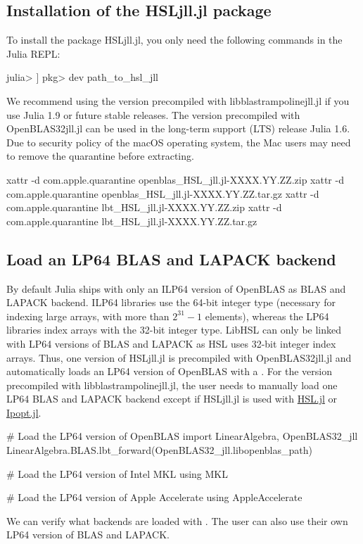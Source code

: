 \documentclass[gdweb]{geradwp}
\renewcommand{\_}{\raisebox{+0.35mm}{\textunderscore}}
\newcommand{\LibHSL}{LibHSL\xspace}
\newcommand{\HSLjll}{HSL\_jll.jl\xspace}
\newcommand{\LBTjll}{libblastrampoline\_jll.jl\xspace}
\newcommand{\OpenBLASjll}{OpenBLAS32\_jll.jl\xspace}
\begin{document}
\subsection{Installation of the \HSLjll package}

To install the package \HSLjll, you only need the following commands in the Julia REPL:
\begin{jllisting}
julia> ]
pkg> dev path_to_hsl_jll
\end{jllisting}
We recommend using the version precompiled with \LBTjll if you use Julia 1.9 or future stable releases.
The version precompiled with \OpenBLASjll can be used in the long-term support (LTS) release Julia 1.6.
Due to security policy of the macOS operating system, the Mac users may need to remove the quarantine before extracting.
\begin{jllisting}
xattr -d com.apple.quarantine openblas_HSL_jll.jl-XXXX.YY.ZZ.zip
xattr -d com.apple.quarantine openblas_HSL_jll.jl-XXXX.YY.ZZ.tar.gz
xattr -d com.apple.quarantine lbt_HSL_jll.jl-XXXX.YY.ZZ.zip
xattr -d com.apple.quarantine lbt_HSL_jll.jl-XXXX.YY.ZZ.tar.gz
\end{jllisting}

\subsection{Load an LP64 BLAS and LAPACK backend}

By default Julia ships with only an ILP64 version of OpenBLAS as BLAS and LAPACK backend.
ILP64 libraries use the 64-bit integer type (necessary for indexing large arrays, with more than $2^{31}-1$ elements), whereas the LP64 libraries index arrays with the 32-bit integer type.
\LibHSL can only be linked with LP64 versions of BLAS and LAPACK as HSL uses 32-bit integer index arrays.
Thus, one version of \HSLjll is precompiled with \OpenBLASjll and automatically loads an LP64 version of OpenBLAS with a .
For the version precompiled with \LBTjll , the user needs to manually load one LP64 BLAS and LAPACK backend except if \HSLjll is used with \href{https://github.com/JuliaSmoothOptimizers/HSL.jl}{HSL.jl} or \href{https://github.com/jump-dev/Ipopt.jl}{Ipopt.jl}.
\begin{jllisting}
# Load the LP64 version of OpenBLAS
import LinearAlgebra, OpenBLAS32_jll
LinearAlgebra.BLAS.lbt_forward(OpenBLAS32_jll.libopenblas_path)

# Load the LP64 version of Intel MKL
using MKL

# Load the LP64 version of Apple Accelerate
using AppleAccelerate
\end{jllisting}
We can verify what backends are loaded with .
The user can also use their own LP64 version of BLAS and LAPACK.
\end{document}
